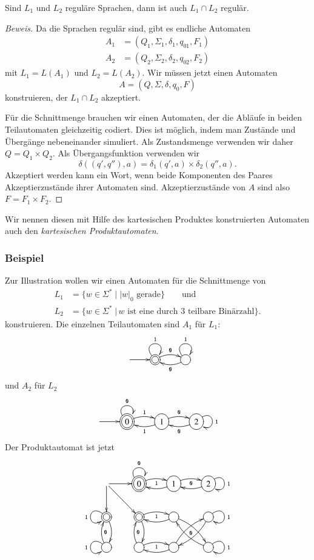 \begin{satz}
\label{satz_intersection}
Sind $L_1$ und $L_2$ reguläre Sprachen, dann
ist auch $L_1\cap L_2$ regulär.
\end{satz}

\begin{proof}[Beweis]
Da die Sprachen regulär sind, gibt es endliche Automaten 
\begin{align*}
A_1&=(Q_1,\Sigma_1,\delta_1, q_{01}, F_1)\\
A_2&=(Q_2,\Sigma_2,\delta_2, q_{02}, F_2)
\end{align*}
mit $L_1=L(A_1)$ und $L_2=L(A_2)$.
Wir müssen jetzt einen Automaten
\[
A = (Q, \Sigma, \delta, q_0, F)
\]
konstruieren, der $L_1\cap L_2$ akzeptiert.

Für die Schnittmenge brauchen wir einen Automaten, der die Abläufe 
in beiden Teilautomaten gleichzeitig codiert.
Dies ist möglich, indem man Zustände und Übergänge nebeneinander
simuliert.
Als Zustandsmenge verwenden wir daher $Q=Q_1\times Q_2$.
Als Übergangsfunktion verwenden wir
\[
\delta((q',q''),a)=\delta_1(q',a)\times \delta_2(q'',a).
\]
Akzeptiert werden kann ein Wort, wenn beide Komponenten des Paares 
Akzeptierzustände ihrer Automaten sind.
Akzeptierzustände von $A$ sind also $F=F_1\times F_2$.
\end{proof}

Wir nennen diesen mit Hilfe des kartesischen Produktes konstruierten
Automaten auch den
{\em kartesischen Produktautomaten}\label{reg_produktautomat}.

\subsubsection{Beispiel}
Zur Illustration wollen 
wir einen Automaten für die Schnittmenge von
\begin{align*}
L_1&=\{w\in\Sigma^*\;|\; \text{$|w|_0$ gerade}\}\qquad\text{und}\\
L_2&=\{w\in\Sigma^*\;|\,\text{$w$ ist eine durch 3 teilbare Binärzahl}\}.
\end{align*}
konstruieren.
Die einzelnen Teilautomaten sind $A_1$ für $L_1$:
\[
\entrymodifiers={++[o][F]}
\xymatrix{
*+\txt{}\ar[r]
	&*++[o][F=]{} \ar@/^/[r]^{\tt 0} \ar@(ul,ur)^{\tt 1}
		&{} \ar@/^/[l]^{\tt 0} \ar@(ul,ur)^{\tt 1}
}
\]
und $A_2$ für $L_2$
\[
\entrymodifiers={++[o][F]}
\xymatrix{
*+\txt{}\ar[r]
	&*++[o][F=]{0} \ar@/^/[r]^{\tt 1} \ar@(ul,ur)^{\tt 0}
		&{1} \ar@/^/[l]^{\tt 1} \ar@/^/[r]^{\tt 0}
			&{2}\ar@(ur,dr)^{\tt 1} \ar@/^/[l]^{\tt 0}
}
\]
Der Produktautomat ist jetzt
\[
\entrymodifiers={++[o][F]}
\xymatrix{
*+\txt{} \ar[r] \ar[d] \ar[dr]
	&*++[o][F=]{0} \ar@/^/[r]_{\tt 1} \ar@(ul,ur)^{\tt 0}
		&{1} \ar@/^/[l] \ar@/^/[r]_{\tt 0}
			&{2}\ar@(ur,dr)^{\tt 1} \ar@/^/[l]
\\
*++[o][F=]{} \ar@/^/[d] \ar@(ul,dl)_{\tt 1}
	&*++[o][F=]{} \ar@/^/[d]{\tt 0} \ar@/^/[r]_{\tt 1}
		&{} \ar@/^/[l] \ar@/^/[dr]_{\tt 0}
			&{}\ar@(ur,dr)^{\tt 1} \ar@/^/[dl]
\\
{} \ar@/^/[u]_{\tt 0} \ar@(ul,dl)_{\tt 1}
	&{} \ar@/^/[u]_{\tt 0} \ar@/^/[r]_{\tt 1}
		&{} \ar@/^/[l] \ar@/^/[ur]
			&{}\ar@(ur,dr)^{\tt 1} \ar@/^/[ul]
}
\]

